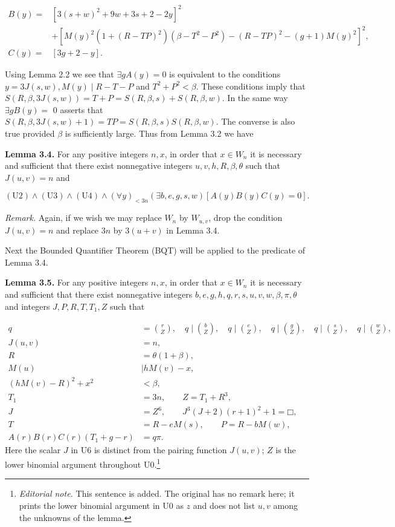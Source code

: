 \documentclass[11pt,a4paper]{article}
\newcommand{\origpage}[1]{\marginnote{\footnotesize\textbf{[#1]}}}
\newcommand{\ednote}[1]{\footnote{\textit{Editorial note.} #1}}
\newcommand{\square}{\mdlgwhtsquare}
\begin{document}
$$
\begin{aligned}
B(y)= & {[3(s+w)^2+9w+3s+2-2y]^2} \\
& +\left[M(y)^{2}\left(1+(R-T P)^{2}\right)\left(\beta-T^{2}-P^{2}\right)-(R-T P)^{2}-(g+1) M(y)^{2}\right]^{2}, \\
C(y)= & {[3 g+2-y] . }
\end{aligned}
$$

Using Lemma 2.2 we see that $\exists g A(y)=0$ is equivalent to the conditions $y=3 J(s, w), M(y) \mid R-T-P$ and $T^{2}+P^{2}<\beta$. These conditions imply that $S(R, \beta, 3 J(s, w))=T+P=S(R, \beta, s)+S(R, \beta, w)$. In the same way $\exists g B(y)=$ 0 asserts that $S(R, \beta, 3 J(s, w)+1)=T P=S(R, \beta, s) S(R, \beta, w)$. The converse is also true provided $\beta$ is sufficiently large. Thus from Lemma 3.2 we have

\par{}\medskip\noindent\textbf{Lemma 3.4.}\origpage{348} For any positive integers $n, x$, in order that $x \in W_{n}$ it is necessary and sufficient that there exist nonnegative integers $u, v, h, R, \beta, \theta$ such that $J(u, v)=n$ and

\begin{equation*}
(\mathrm{U2})\wedge(\mathrm{U3})\wedge(\mathrm{U4})\wedge
(\forall y)_{<3n}(\exists b,e,g,s,w)[A(y)B(y)C(y)=0].\tag{3.4}
\end{equation*}

\noindent\textit{Remark.} Again, if we wish we may replace $W_{n}$ by $W_{u, v}$, drop the condition $J(u, v)=n$ and replace $3 n$ by $3(u+v)$ in Lemma 3.4.

Next the Bounded Quantifier Theorem (BQT) will be applied to the predicate of Lemma 3.4.

\par{}\medskip\noindent\textbf{Lemma 3.5.} For any positive integers $n, x$, in order that $x \in W_{n}$ it is necessary and sufficient that there exist nonnegative integers $b,e,g,h,q,r,s,u,v,w,\beta,\pi,\theta$ and integers $J, P, R, T, T_{1}, Z$ such that

\begin{align*}
q&=\binom rZ,\quad q\mid\binom bZ,\quad q\mid\binom eZ,\quad
q\mid\binom gZ,\quad q\mid\binom sZ,\quad q\mid\binom wZ, \tag{U0}\\
J(u,v)&=n, \tag{U1}\\
R&=\theta(1+\beta), \tag{U2}\\
M(u)&\mid hM(v)-x, \tag{U3}\\
(hM(v)-R)^2+x^2&<\beta, \tag{U4}\\
T_1&=3n,\qquad Z=T_1+R^3, \tag{U5}\\
J&=Z^6,\qquad J^3(J+2)(r+1)^2+1=\square, \tag{U6}\\
T&=R-eM(s),\qquad P=R-bM(w), \tag{U7}\\
A(r)B(r)C(r)(T_1+g-r)&=q\pi. \tag{U8}
\end{align*}
Here the scalar $J$ in U6 is distinct from the pairing function $J(u,v)$;
$Z$ is the lower binomial argument throughout U0.\ednote{This sentence is added. The original has no remark here; it prints the lower binomial argument in U0 as $z$ and does not list $u,v$ among the unknowns of the lemma.}
\end{document}
